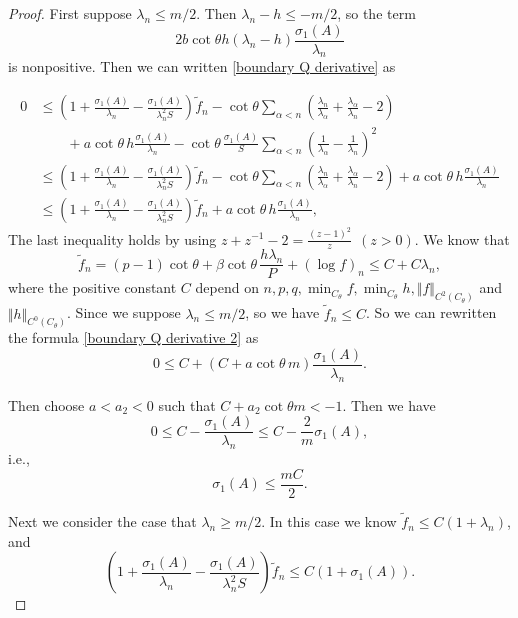 \documentclass[11pt]{amsart}
\numberwithin{equation} {section}
\numberwithin{equation}{section}
\begin{document}
\begin{proof}
First suppose $\lambda_n\leq m/2$. Then $\lambda_n-h\leq -m/2$, so the
 term
 $$2b\cot\theta h(\lambda_n -h)\frac{\sigma_1(A)}{\lambda_n}$$
 is nonpositive. Then we can written \eqref{boundary Q derivative} as

 \begin{equation}\label{boundary Q derivative 2}
\begin{split}
        0&\leq \left(1+\frac{\sigma_1(A)}{\lambda_n}
        -\frac{\sigma_1(A)}{\lambda_n^2S}\right)\tilde f_n
        -\cot\theta
        \sum_{\alpha<n}\left(\frac{\lambda_n}{\lambda_{\alpha}}
        +\frac{\lambda_{\alpha}}{\lambda_n}-2\right)\\
        &\qquad
       +a\cot\theta\,h\frac{\sigma_1(A)}{\lambda_n} -\cot\theta\,\frac{\sigma_1(A)}{S}
        \sum_{\alpha<n}\left(\frac1{\lambda_{\alpha}}
        -\frac1{\lambda_n}\right)^2  \\ 
        & 
        \leq \left(1+\frac{\sigma_1(A)}{\lambda_n}
        -\frac{\sigma_1(A)}{\lambda_n^2S}\right)\tilde f_n
        -\cot\theta
        \sum_{\alpha<n}\left(\frac{\lambda_n}{\lambda_{\alpha}}
        +\frac{\lambda_{\alpha}}{\lambda_n}-2\right) +a\cot\theta\,h\frac{\sigma_1(A)}{\lambda_n}\\ 
        &\leq 
        \left(1+\frac{\sigma_1(A)}{\lambda_n}
        -\frac{\sigma_1(A)}{\lambda_n^2S}\right)\tilde f_n +a\cot\theta\,h\frac{\sigma_1(A)}{\lambda_n},
\end{split}
\end{equation}
 The last inequality holds by using $z+z^{-1}-2 = \frac{(z-1)^2}{z} ~~(z>0)$.
We know that 
$$ \tilde f_n
        =(p-1)\cot\theta
        +\beta\cot\theta\,
        \frac{h\lambda_n}{P}
        +(\log f)_n \leq C+C\lambda_n,
        $$
where the positive constant $C$ depend on $n, p, q, \min_{C_{\theta}}f, \min_{C_{\theta}}h, \Vert f\Vert_{C^2 (C_{\theta})}$ and $\Vert h\Vert _{C^0 (C_{\theta})}$. Since we suppose $\lambda_n \leq m/2$, so we have $\tilde{f}_n\leq C$. So we can rewritten the formula \eqref{boundary Q derivative 2} as 
\begin{equation}\label{s4-3}
0\leq C+\left(C+a\cot\theta\,m\right)
        \frac{\sigma_1(A)}{\lambda_n}.
\end{equation}

Then choose $a<a_2<0$ such that $C+a_2 \cot\theta m<-1$. Then we have
$$0\leq C-\frac{\sigma_1(A)}{\lambda_n}\leq C-\frac{2}{m}\sigma_1(A), $$
i.e.,
$$\sigma_1(A)\leq \frac{mC}{2}.$$

Next we consider the case that $\lambda_n\geq m/2$. In this case we know 
$\tilde f_n\leq C(1+\lambda_n)$, and
\[
        \left(1+\frac{\sigma_1(A)}{\lambda_n}
        -\frac{\sigma_1(A)}{\lambda_n^2S}\right)\tilde f_n
        \leq C(1+\sigma_1(A)).
\]


\end{proof}
\end{document}
